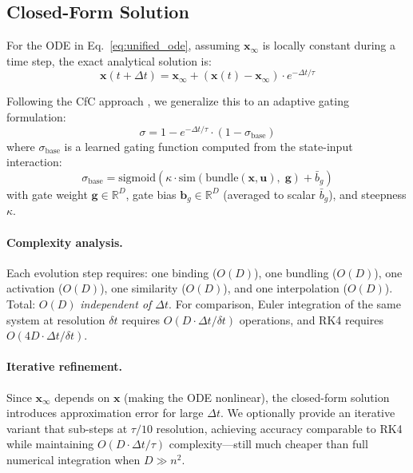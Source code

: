 \documentclass{article}
\newcommand{\R}{\mathbb{R}}
\newcommand{\hvx}{\mathbf{x}}
\newcommand{\hvinput}{\mathbf{u}}
\newcommand{\xinf}{\mathbf{x}_\infty}
\begin{document}
\subsection{Closed-Form Solution}

For the ODE in Eq.~\ref{eq:unified_ode}, assuming $\xinf$ is locally constant during a time step, the exact analytical solution is:
\begin{equation}\label{eq:exact}
    \hvx(t{+}\Delta t) = \xinf + (\hvx(t) - \xinf) \cdot e^{-\Delta t / \tau}
\end{equation}

Following the CfC approach \cite{hasani2022closed}, we generalize this to an adaptive gating formulation:
\begin{equation}\label{eq:gating}
    \sigma = 1 - e^{-\Delta t / \tau} \cdot (1 - \sigma_\text{base})
\end{equation}
where $\sigma_\text{base}$ is a learned gating function computed from the state-input interaction:
\begin{equation}
    \sigma_\text{base} = \text{sigmoid}\!\left(\kappa \cdot \text{sim}\!\left(\text{bundle}(\hvx, \hvinput), \; \mathbf{g}\right) + \bar{b}_g\right)
\end{equation}
with gate weight $\mathbf{g} \in \R^D$, gate bias $\mathbf{b}_g \in \R^D$ (averaged to scalar $\bar{b}_g$), and steepness $\kappa$.

\paragraph{Complexity analysis.} Each evolution step requires: one binding ($O(D)$), one bundling ($O(D)$), one activation ($O(D)$), one similarity ($O(D)$), and one interpolation ($O(D)$). Total: $O(D)$ \emph{independent of $\Delta t$}. For comparison, Euler integration of the same system at resolution $\delta t$ requires $O(D \cdot \Delta t / \delta t)$ operations, and RK4 requires $O(4D \cdot \Delta t / \delta t)$.

\paragraph{Iterative refinement.} Since $\xinf$ depends on $\hvx$ (making the ODE nonlinear), the closed-form solution introduces approximation error for large $\Delta t$. We optionally provide an iterative variant that sub-steps at $\tau/10$ resolution, achieving accuracy comparable to RK4 while maintaining $O(D \cdot \Delta t / \tau)$ complexity---still much cheaper than full numerical integration when $D \gg n^2$.
\end{document}
